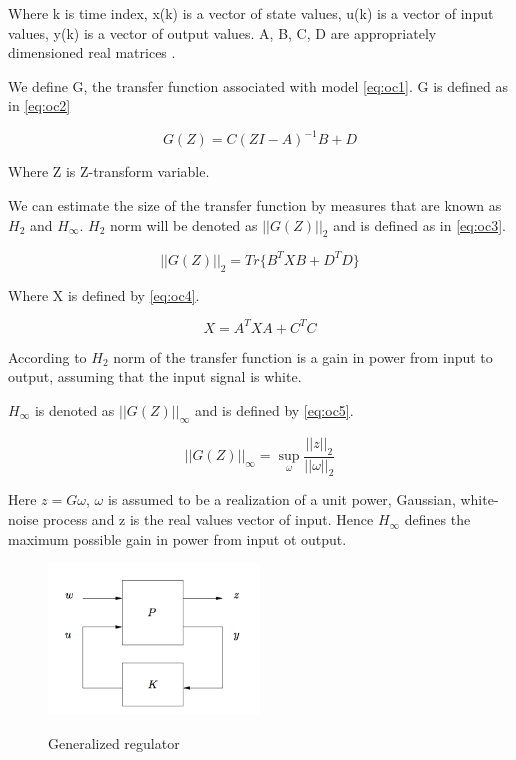 \documentclass[12pt,a4paper]{report}
\begin{document}
			Where k is time index, x(k) is a vector of state values, u(k) is a vector of input values, y(k) is a vector of output values. A, B, C, D are  appropriately dimensioned real matrices \cite{hazell2008discrete}.
			
			We define G, the  transfer function associated with model \ref{eq:oc1}. G is defined as in \ref{eq:oc2}
			
			\begin{equation}\label{eq:oc2}
				G(Z) = C(ZI - A)^{-1}B+D
			\end{equation}
			
			Where Z is Z-transform variable.
			
			We can estimate the size of the transfer function by measures that are known as $H_2$ and $H_\infty$. $H_2$ norm will be denoted as $||G(Z)||_2$ and is defined as in \ref{eq:oc3}.
			
			\begin{equation}\label{eq:oc3}
				||G(Z)||_2 = Tr\{ B^{T} XB + D^{T} D \}
			\end{equation}
			
			Where X is defined by \ref{eq:oc4}.
			
			\begin{equation}\label{eq:oc4}
				X = A^{T} XA + C^{T} C
			\end{equation}
			
			According to \cite{hazell2008discrete} 	$H_2$ norm of the transfer function is a gain in power from input to output, assuming that the input signal is white.  
			
			$H_\infty$ is denoted as $||G(Z)||_\infty$ and is defined by \ref{eq:oc5}.		
			
			\begin{equation}\label{eq:oc5}
				||G(Z)||_\infty = \sup_{\omega} \dfrac{||z||_2}{||\omega||_2}
			\end{equation}
			
			Here $z = G\omega$, $\omega$ is assumed to be a realization of a unit power, Gaussian, white-noise process and z is the real values vector of input. Hence $H_\infty$ defines the maximum possible gain in power from input ot output.
			
			\begin{figure}[H]
				\vspace{-0.2cm}
				\centering
				{\includegraphics[width=0.5\textwidth]{11}}
				\caption{Generalized regulator \cite{hazell2008discrete}}
				\label{fig:11}
				\vspace{-0.1cm}
			\end{figure}
			
\end{document}
